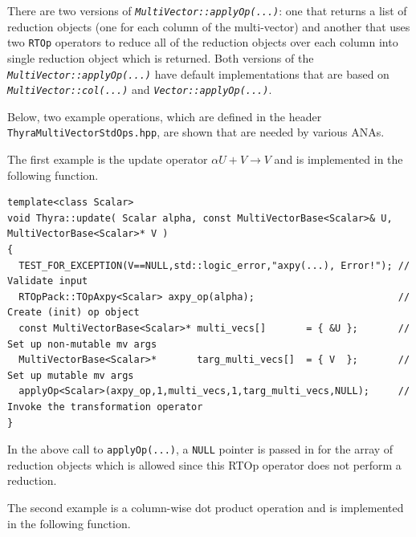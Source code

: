 \documentclass[pdf,ps2pdf,11pt]{SANDreport}
\begin{document}
There are two versions of
{}\texttt{\textit{Multi\-Vector\-::applyOp(\-...)}}: one that returns
a list of reduction objects (one for each column of the multi-vector)
and another that uses two {}\texttt{RTOp} operators to reduce all of
the reduction objects over each column into single reduction object
which is returned.  Both versions of the
{}\texttt{\textit{Multi\-Vector\-::applyOp(\-...)}} have default
implementations that are based on
{}\texttt{\textit{Multi\-Vector\-::col(...)}} and
{}\texttt{\textit{Vector\-::applyOp(\-...)}}.

Below, two example operations, which are defined in the header
{}\texttt{Thyra\-Multi\-Vector\-Std\-Ops.hpp}, are shown that are
needed by various ANAs.

The first example is the update operator $\alpha U + V \rightarrow V$
and is implemented in the following function.

{\scriptsize\begin{verbatim}
template<class Scalar>
void Thyra::update( Scalar alpha, const MultiVectorBase<Scalar>& U, MultiVectorBase<Scalar>* V )
{
  TEST_FOR_EXCEPTION(V==NULL,std::logic_error,"axpy(...), Error!"); // Validate input
  RTOpPack::TOpAxpy<Scalar> axpy_op(alpha);                         // Create (init) op object
  const MultiVectorBase<Scalar>* multi_vecs[]       = { &U };       // Set up non-mutable mv args
  MultiVectorBase<Scalar>*       targ_multi_vecs[]  = { V  };       // Set up mutable mv args
  applyOp<Scalar>(axpy_op,1,multi_vecs,1,targ_multi_vecs,NULL);     // Invoke the transformation operator
}
\end{verbatim}}

{}\noindent{}In the above call to {}\texttt{applyOp(\-...)}, a
{}\texttt{NULL} pointer is passed in for the array of reduction
objects which is allowed since this RTOp operator does not perform a
reduction.

The second example is a column-wise dot product operation and is
implemented in the following function.
\end{document}
